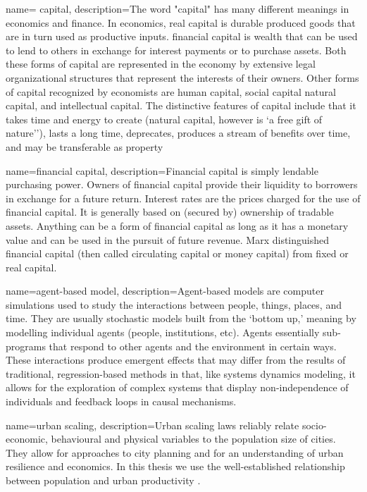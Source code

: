 {
name= capital,
description={The word "capital" has many different meanings in economics and finance.  In economics, real capital is durable produced goods that are in turn used as productive inputs. \Gls{financial capital} is wealth that can be used to lend to others in exchange for interest payments or to purchase assets. Both these forms of capital are represented in the economy by extensive legal organizational structures that represent the interests of their owners. Other forms of capital recognized by economists are human capital, social capital natural capital, and intellectual capital. The distinctive  features of capital include that it takes time and energy to create (natural capital, however is  `a free gift of nature''), lasts a long time, deprecates, produces a stream of benefits over time,  and may be transferable as property}
}

{
name=financial capital,
description={Financial capital is simply lendable purchasing power. Owners of financial capital provide their liquidity to borrowers in exchange for a future return. Interest rates are the prices charged for the use of financial capital. It is generally based on (secured by) ownership of tradable assets.  Anything can be a form of financial capital as long as it has a monetary value and can be  used in the pursuit of future revenue. Marx distinguished  financial capital (then called circulating capital or money capital) from fixed or real capital.}
}

{
name=agent-based model,
description={Agent-based models are computer simulations used to study the interactions between people, things, places, and time. They are usually stochastic models built from the `bottom up,' meaning by modelling individual agents (people, institutions, etc). Agents essentially sub-programs that respond to other agents and the environment in certain ways. These interactions produce emergent effects that may differ from the results of traditional, regression-based methods in that, like systems dynamics modeling, it allows for the exploration of complex systems that display non-independence of individuals and \gls{feedback} loops in causal mechanisms.}
}

{
name=urban scaling,
description={Urban scaling laws reliably relate socio-economic, behavioural and physical variables to the population size of cities. They allow for approaches  to city planning and for an understanding of urban resilience and economics. In this thesis we use the well-established relationship between population and urban productivity \cite{GET_doi:10.1098/rsif.2020.0705}}.
}

